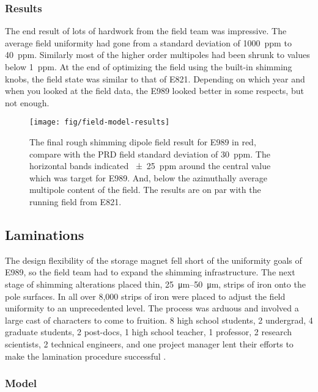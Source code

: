 \subsubsection{Results}

The end result of lots of hardwork from the field team was impressive.  The average field uniformity had gone from a standard deviation of \SI{1000}{ppm}  to \SI{40}{ppm}.  Similarly most of the higher order multipoles had been shrunk to values below \SI{1}{ppm}.  At the end of optimizing the field using the built-in shimming knobs, the field state was similar to that of E821.  Depending on which year and when you looked at the field data, the E989 looked better in some respects, but not enough.

\begin{figure}
\label{fig:field-model-results}
\texttt{[image: fig/field-model-results]}
\caption{The final rough shimming dipole field result for E989 in red, compare with the PRD field standard deviation of \SI{30}{ppm}.  The horizontal bands indicated \SI{\pm 25}{ppm} around the central value which was target for E989.  And, below the azimuthally average multipole content of the field.  The results are on par with the running field from E821.}
\end{figure}

\subsection{Laminations}

The design flexibility of the storage magnet fell short of the uniformity goals of E989, so the field team had to expand the shimming infrastructure.  The next stage of shimming alterations placed thin, \SIrange{25}{50}{\micro\meter}, strips of iron onto the pole surfaces.  In all over 8,000 strips of iron were placed to adjust the field uniformity to an unprecedented level.  The process was arduous and involved a large cast of characters to come to fruition.  8 high school students, 2 undergrad, 4 graduate students, 2 post-docs, 1 high school teacher, 1 professor, 2 research scientists, 2 technical engineers, and one project manager lent their efforts to make the lamination procedure successful .

\subsubsection{Model}

